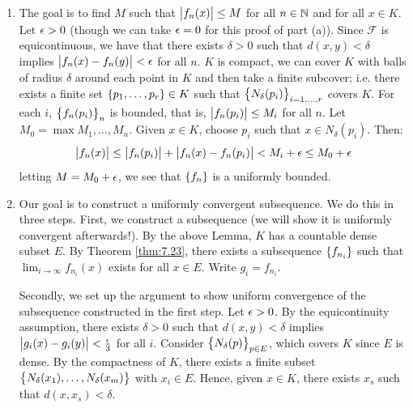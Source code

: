 \begin{nproof}
    \begin{enumerate}
        \item The goal is to find $M$ such that $\abs{f_n(x)} \leq M$ for all $n \in \mathbb{N}$ and for all $x \in K$. Let $\epsilon > 0$ (though we can take $\epsilon = 0$ for this proof of part (a)). Since $\mathcal{F}$ is equicontinuous, we have that there exists $\delta > 0$ such that $d(x, y) < \delta$ implies $\abs{f_n(x) - f_n(y)} < \epsilon$ for all $n$. $K$ is compact, we can cover $K$ with balls of radius $\delta$ around each point in $K$ and then take a finite subcover; i.e. there exists a finite set $\set{p_1, \ldots, p_r} \in K$ such that $\set{N_\delta(p_i)}_{i = 1, \ldots, r}$ covers $K$. For each $i$, $\set{f_n(p_i)}_n$ is bounded, that is, $\abs{f_n(p_i)} \leq M_i$ for all $n$. Let $M_0 = \max{M_1, \ldots, M_n}$. Given $x \in K$, choose $p_i$ such that $x \in N_\delta(p_i)$. Then:
        \begin{align*}
            \abs{f_n(x)} \leq \abs{f_n(p_i)} + \abs{f_n(x) - f_n(p_i)} < M_i + \epsilon \leq M_0 + \epsilon
        \end{align*} 
        letting $M = M_0 + \epsilon$, we see that $\set{f_n}$ is a uniformly bounded.
        \item Our goal is to construct a uniformly convergent subsequence. We do this in three steps. First, we construct a subsequence (we will show it is uniformly convergent afterwards!). By the above Lemma, $K$ has a countable dense subset $E$. By Theorem \ref{thm:7.23}, there exists a subsequence $\set{f_{n_i}}$ such that $\lim_{i \rightarrow \infty} f_{n_i}(x)$ exists for all $x \in E$. Write $g_i = f_{n_i}$.
        
        Secondly, we set up the argument to show uniform convergence of the subsequence constructed in the first step. Let $\epsilon > 0$. By the equicontinuity assumption, there exists $\delta > 0$ such that $d(x, y) < \delta$ implies $\abs{g_i(x) - g_i(y)} < \frac{\epsilon}{3}$ for all $i$. Consider $\set{N_\delta(p)}_{p \in E}$, which covers $K$ since $E$ is dense. By the compactness of $K$, there exists a finite subset $\set{N_{\delta}(x_1), \ldots, N_\delta(x_m)}$ with $x_i \in E$. Hence, given $x \in K$, there exists $x_s$ such that $d(x, x_s) < \delta$. 


\end{enumerate}
\end{nproof}
